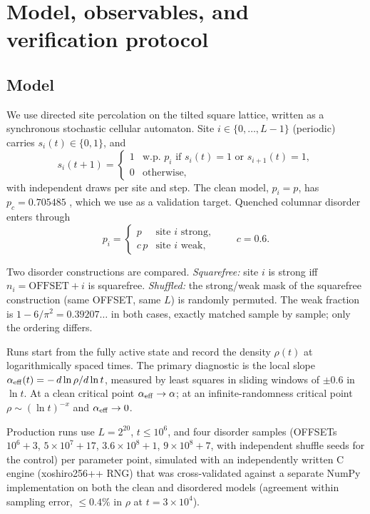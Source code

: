 \documentclass[aps,pre,twocolumn,superscriptaddress,nofootinbib]{revtex4-2}
\begin{document}
\section{Model, observables, and verification protocol}

\subsection{Model}

We use directed site percolation on the tilted square lattice, written as a synchronous
stochastic cellular automaton. Site $i \in \{0,\dots,L-1\}$ (periodic) carries
$s_i(t)\in\{0,1\}$, and
\begin{equation}
s_i(t{+}1)=
\begin{cases}
1 & \text{w.p. } p_i \text{ if } s_i(t)=1 \text{ or } s_{i+1}(t)=1,\\
0 & \text{otherwise,}
\end{cases}
\label{eq:model}
\end{equation}
with independent draws per site and step. The clean model, $p_i = p$, has
$p_c = 0.705485$ \cite{Jensen1999}, which we use as a validation target. Quenched columnar
disorder enters through
\begin{equation}
p_i = \begin{cases} p & \text{site } i \text{ strong},\\ c\,p & \text{site } i \text{ weak},\end{cases}
\qquad c = 0.6 .
\end{equation}

Two disorder constructions are compared.
\emph{Squarefree:} site $i$ is strong iff $n_i = \mathrm{OFFSET} + i$ is squarefree.
\emph{Shuffled:} the strong/weak mask of the squarefree construction (same OFFSET, same $L$)
is randomly permuted. The weak fraction is $1-6/\pi^2 = 0.39207\ldots$ in both cases, exactly
matched sample by sample; only the ordering differs.

Runs start from the fully active state and record the density $\rho(t)$ at logarithmically
spaced times. The primary diagnostic is the local slope
$\alpha_{\rm eff}(t) = -\,d\ln\rho / d\ln t$, measured by least squares in sliding windows of
$\pm 0.6$ in $\ln t$. At a clean critical point $\alpha_{\rm eff} \to \alpha$; at an
infinite-randomness critical point $\rho \sim (\ln t)^{-x}$ and $\alpha_{\rm eff} \to 0$.

Production runs use $L=2^{20}$, $t \le 10^6$, and four disorder samples
(OFFSETs $10^6{+}3$, $5\times 10^7{+}17$, $3.6\times 10^8{+}1$, $9\times 10^8{+}7$, with
independent shuffle seeds for the control) per parameter point, simulated with an
independently written C engine (xoshiro256++ RNG) that was cross-validated against a separate
NumPy implementation on both the clean and disordered models (agreement within sampling error,
$\le 0.4\%$ in $\rho$ at $t=3\times 10^4$).
\end{document}
